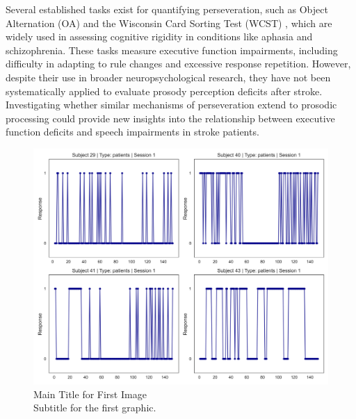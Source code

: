 Several established tasks exist for quantifying perseveration, such as Object Alternation (OA) \cite{freedman_orbitofrontal_1998} and the Wisconsin Card Sorting Test (WCST) \cite{abbruzzese_performance_1996}, which are widely used in assessing cognitive rigidity in conditions like aphasia and schizophrenia. These tasks measure executive function impairments, including difficulty in adapting to rule changes and excessive response repetition. However, despite their use in broader neuropsychological research, they have not been systematically applied to evaluate prosody perception deficits after stroke. Investigating whether similar mechanisms of perseveration extend to prosodic processing could provide new insights into the relationship between executive function deficits and speech impairments in stroke patients.
\begin{figure}[H]
    \centering
    \includegraphics[width=15cm]{MainLayout/Images/chapter5/patient_responses.jpg}
    \caption{Main Title for First Image \\ \small Subtitle for the first graphic.}
    \label{fig:patient_responses}
\end{figure}

